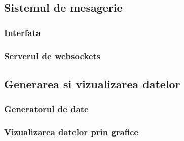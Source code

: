 \documentclass[12pt,a4paper]{article}
\begin{document}
\subsection{Sistemul de mesagerie}

\subsubsection{Interfata}

\subsubsection{Serverul de websockets}

\subsection{Generarea si vizualizarea datelor}

\subsubsection{Generatorul de date}

\subsubsection{Vizualizarea datelor prin grafice}

\newpage
\end{document}
